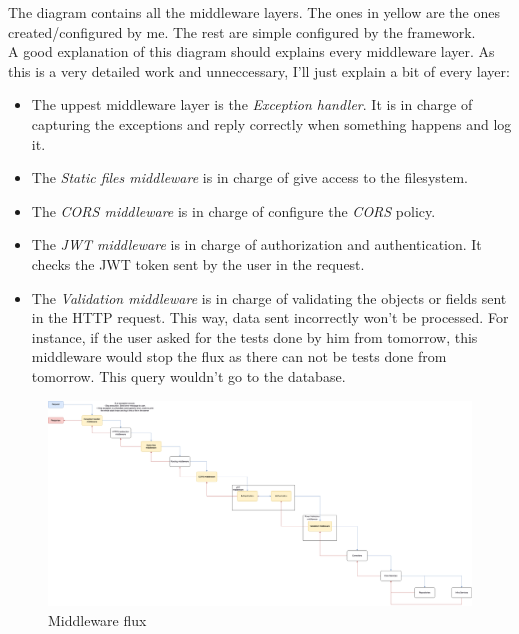     The diagram contains all the middleware layers. The ones in yellow are the ones created/configured by me. The rest are simple configured by the framework. \\

    A good explanation of this diagram should explains every middleware layer. As this is a very detailed work and unneccessary, I'll just explain a bit of every layer:
    \begin{itemize}[noitemsep]
        \item The uppest middleware layer is the \textit{Exception handler}. It is in charge of capturing the exceptions and reply correctly when something happens and log it.
        \item The \textit{Static files middleware} is in charge of give access to the filesystem. \\
        \item The \textit{CORS middleware} is in charge of configure the \textit{CORS} policy. \\
        \item The \textit{JWT middleware} is in charge of authorization and authentication. It checks the {JWT token} sent by the user in the request. 
        \item The \textit{Validation middleware} is in charge of validating the objects or fields sent in the {HTTP request}. This way, data sent incorrectly won't be processed. For instance, if the user asked for the tests done by him from tomorrow, this middleware would stop the flux as there can not be tests done from tomorrow. This query wouldn't go to the database. 
    \end{itemize}
        \newpage
        \begin{figure}[H]
            \centering
                \includegraphics[angle=90, width=\textwidth, height=\textheight]{assets/diagrams/middleware.png}
            \caption{Middleware flux}
            \label{fig:implementation_middleware}
        \end{figure}

